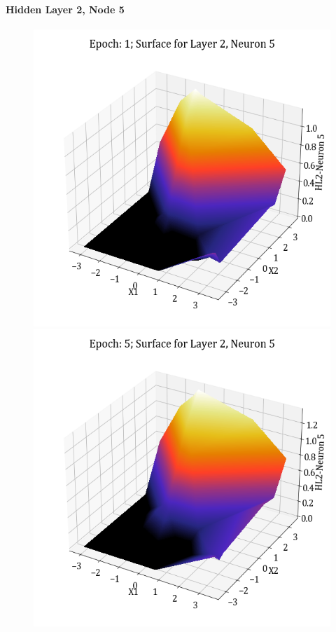 \documentclass[11pt,a4paper]{article}
\begin{document}
\paragraph{Hidden Layer 2, Node 5}
\begin{figure}[H]
    \centering
    \includegraphics[scale=0.4]{images/1B_MLFFNN_E1_HL2_N5.png}
    \includegraphics[scale=0.4]{images/1B_MLFFNN_E5_HL2_N5.png}

\end{figure}
\end{document}
